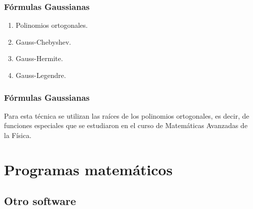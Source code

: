 \documentclass[12pt]{beamer}
\begin{document}
\begin{frame}
\frametitle{Fórmulas Gaussianas}
\begin{enumerate}[<+->]
\item Polinomios ortogonales.
\item Gauss-Chebyshev.
\item Gauss-Hermite.
\item Gauss-Legendre.
\end{enumerate}
\end{frame}
\begin{frame}
\frametitle{Fórmulas Gaussianas}
Para esta técnica se utilizan las raíces de los polinomios ortogonales, es decir, de funciones especiales que se estudiaron en el curso de Matemáticas Avanzadas de la Física.
\end{frame}

\section{Programas matemáticos}
\subsection{Otro software}
\end{document}
